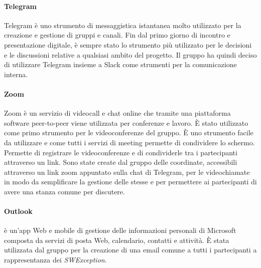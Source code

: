 \paragraph{Telegram}
Telegram è uno strumento di messaggistica istantanea molto utilizzato per la creazione e gestione di gruppi e canali. Fin dal primo giorno di incontro e presentazione digitale, è sempre stato lo strumento più utilizzato per le decisioni e le discussioni relative a qualsiasi ambito del progetto. Il gruppo ha quindi deciso di utilizzare Telegram insieme a Slack come strumenti per la comunicazione interna.

\paragraph{Zoom}
Zoom è un servizio di videocall e chat online che tramite una piattaforma software peer-to-peer viene utilizzata per conferenze e lavoro. È stato utilizzato come primo strumento per le videoconferenze del gruppo. È uno strumento facile da utilizzare e come tutti i servizi di meeting permette di condividere lo schermo. Permette di registrare le videoconferenze e di condividerle tra i partecipanti attraverso un link. Sono state create dal gruppo delle coordinate, accessibili attraverso un link zoom appuntato sulla chat di Telegram, per le videochiamate in modo da semplificare la gestione delle stesse e per permettere ai partecipanti di avere una stanza comune per discutere.

\paragraph{Outlook}
 è un'app Web e mobile di gestione delle informazioni personali di Microsoft composta da servizi di posta Web, calendario, contatti e attività. È stata utilizzata dal gruppo per la creazione di una email comune a tutti i partecipanti a rappresentanza dei \textit{SWException}.

